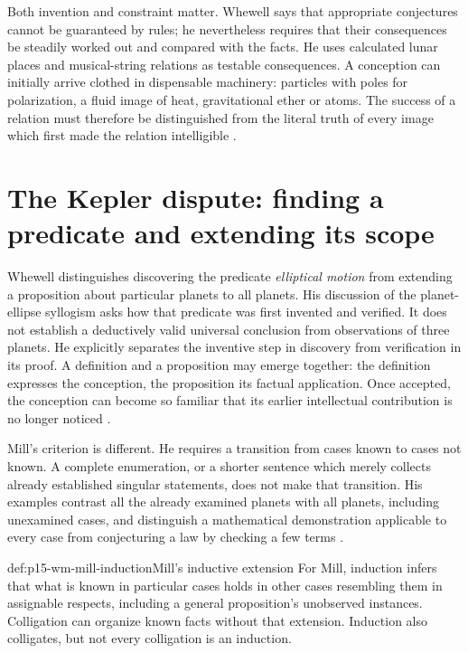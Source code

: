 Both invention and constraint matter. Whewell says that appropriate
conjectures cannot be guaranteed by rules; he nevertheless requires that
their consequences be steadily worked out and compared with the facts.
He uses calculated lunar places and musical-string relations as
testable consequences. A conception can initially arrive clothed in
dispensable machinery: particles with poles for polarization, a fluid
image of heat, gravitational ether or atoms. The success of a relation
must therefore be distinguished from the literal truth of every image
which first made the relation intelligible
\parencite[II.IV.10--12, pp.~66--69]{Whewell1858NovumPG}.

\section{The Kepler dispute: finding a predicate and extending its scope}
\label{sec:p15-wm-kepler}

Whewell distinguishes discovering the predicate \emph{elliptical motion}
from extending a proposition about particular planets to all planets.
His discussion of the planet-ellipse syllogism asks how that predicate
was first invented and verified. It does not establish a deductively
valid universal conclusion from observations of three planets.
He explicitly separates the inventive step in discovery from verification
in its proof. A definition and a proposition may emerge together:
the definition expresses the conception, the proposition its factual
application. Once accepted, the conception can become so familiar that
its earlier intellectual contribution is no longer noticed
\parencite[II.V.3--5, pp.~74--78]{Whewell1858NovumPG}.

Mill's criterion is different. He requires a transition from cases known
to cases not known. A complete enumeration, or a shorter sentence which
merely collects already established singular statements, does not make
that transition. His examples contrast all the already examined planets
with all planets, including unexamined cases, and distinguish a
mathematical demonstration applicable to every case from conjecturing
a law by checking a few terms
\parencite[III.I.1--2; III.II.1--2]{Mill1882SystemLogicPG}.

\begin{hbdefinition}{def:p15-wm-mill-induction}{Mill's inductive extension}
For Mill, induction infers that what is known in particular cases holds
in other cases resembling them in assignable respects, including a
general proposition's unobserved instances.
Colligation can organize known facts without that extension.
Induction also colligates, but not every colligation is an induction.
\end{hbdefinition}

